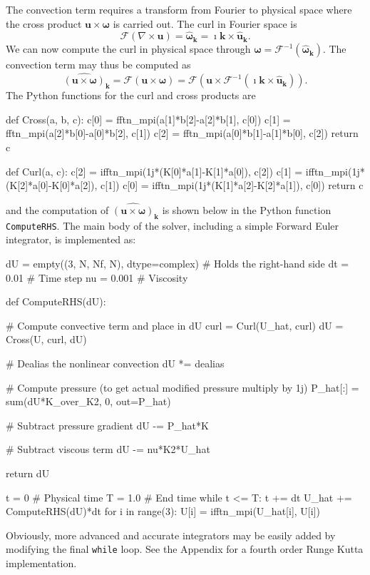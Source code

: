 \documentclass[11pt, oneside]{article}
\newcommand{\inpyth}{\lstinline[keywordstyle={}, basicstyle=\ttfamily]} %[]%
\begin{document}
The convection term requires a transform from Fourier to physical space where the cross product $\bm{u} \times \bm{\omega}$ is carried out. The curl in Fourier space is
\begin{equation}
\mathcal{F}(\nabla \times \bm{u}) = \hat{\bm{\omega}}_{\bm{k}} = \imath \bm{k} \times \hat{\bm{u}}_{\bm{k}}.
\end{equation}
We can now compute the curl in physical space through $\bm{\omega} = \mathcal{F}^{-1}(\hat{\bm{\omega}}_{\bm{k}})$. The convection term may thus be computed as
\begin{equation}
\widehat{( \bm{u} \times \bm{\omega})}_{\bm{k}} = \mathcal{F}(\bm{u} \times \bm{\omega}) = \mathcal{F} (\bm{u} \times \mathcal{F}^{-1}(\imath \bm{k} \times \hat{\bm{u}}_{\bm{k}})).
\label{eq:curl_convection}
\end{equation}
The Python functions for the curl and cross products are

\begin{python}
def Cross(a, b, c):
    c[0] = fftn_mpi(a[1]*b[2]-a[2]*b[1], c[0])
    c[1] = fftn_mpi(a[2]*b[0]-a[0]*b[2], c[1])
    c[2] = fftn_mpi(a[0]*b[1]-a[1]*b[0], c[2])
    return c

def Curl(a, c):
    c[2] = ifftn_mpi(1j*(K[0]*a[1]-K[1]*a[0]), c[2])
    c[1] = ifftn_mpi(1j*(K[2]*a[0]-K[0]*a[2]), c[1])
    c[0] = ifftn_mpi(1j*(K[1]*a[2]-K[2]*a[1]), c[0])
    return c

\end{python}
and the computation of $\widehat{( \bm{u} \times \bm{\omega})}_{\bm{k}}$ is shown below in the Python function \inpyth{ComputeRHS}. The main body of the solver, including a simple Forward Euler integrator, is implemented as:

\begin{python}
dU = empty((3, N, Nf, N), dtype=complex)  # Holds the right-hand side
dt = 0.01    # Time step
nu = 0.001   # Viscosity

def ComputeRHS(dU):

    # Compute convective term and place in dU
    curl = Curl(U_hat, curl)
    dU = Cross(U, curl, dU)

    # Dealias the nonlinear convection
    dU *= dealias

    # Compute pressure (to get actual modified pressure multiply by 1j)
    P_hat[:] = sum(dU*K_over_K2, 0, out=P_hat)

    # Subtract pressure gradient
    dU -= P_hat*K

    # Subtract viscous term
    dU -= nu*K2*U_hat

    return dU

t = 0        # Physical time
T = 1.0      # End time
while t <= T:
    t += dt
    U_hat += ComputeRHS(dU)*dt
    for i in range(3):
        U[i] = ifftn_mpi(U_hat[i], U[i])

\end{python}
Obviously, more advanced and accurate integrators may be easily added by modifying the final \inpyth{while} loop. See the Appendix for a fourth order Runge Kutta implementation.
\end{document}
